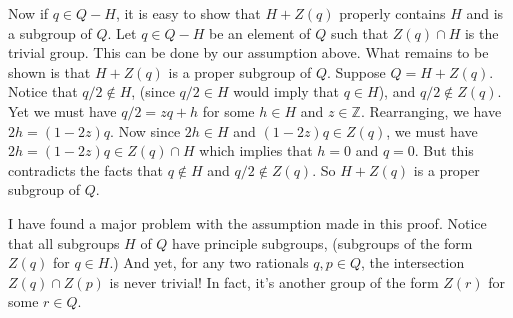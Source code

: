 \documentclass[12pt]{article}
\newcommand{\Z}{\mathbb{Z}}
\begin{document}
Now if $q\in Q-H$, it is easy to show that $H+Z(q)$
properly contains $H$ and is a subgroup of $Q$.
Let $q\in Q-H$ be an element of $Q$ such that $Z(q)\cap H$
is the trivial group.  This can be done by our assumption above.
What remains to be shown is that $H+Z(q)$ is a proper
subgroup of $Q$.  Suppose $Q=H+Z(q)$.
Notice that $q/2\not\in H$, (since $q/2\in H$ would imply that $q\in H$), and $q/2\not\in Z(q)$.
Yet we must have $q/2=zq+h$ for some $h\in H$ and $z\in\Z$.
Rearranging, we have $2h=(1-2z)q$.  Now since $2h\in H$
and $(1-2z)q\in Z(q)$, we must have $2h=(1-2z)q\in Z(q)\cap H$ which
implies that $h=0$ and $q=0$.  But this contradicts the facts that
$q\not\in H$ and $q/2\not\in Z(q)$.  So $H+Z(q)$ is a proper subgroup of $Q$.

I have found a major problem with the assumption made in this proof.
Notice that all subgroups $H$ of $Q$ have principle subgroups,
(subgroups of the form $Z(q)$ for $q\in H$.)  And yet, for
any two rationals $q,p\in Q$, the intersection $Z(q)\cap Z(p)$
is never trivial!  In fact, it's another group of the form $Z(r)$
for some $r\in Q$.
\end{document}
